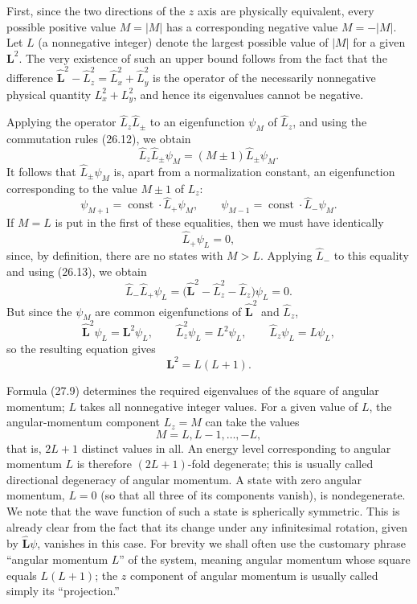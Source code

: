 First, since the two directions of the $z$ axis are physically equivalent,
every possible positive value $M=|M|$ has a corresponding negative value
$M=-|M|$. Let $L$ (a nonnegative integer) denote the largest possible value
of $|M|$ for a given $\mathbf L^2$. The very existence of such an upper bound
follows from the fact that the difference
$\hat{\mathbf L}^{2}-\hat L_z^{2}=\hat L_x^{2}+\hat L_y^{2}$ is the operator
of the necessarily nonnegative physical quantity $L_x^2+L_y^2$,
and hence its eigenvalues cannot be negative.

Applying the operator $\hat L_z\hat L_\pm$ to an eigenfunction $\psi_M$ of
$\hat L_z$, and using the commutation rules (26.12), we obtain
\begin{equation}
  \hat L_z\hat L_\pm\psi_M=(M\pm1)\hat L_\pm\psi_M.
  \tag{27.6}
\end{equation}
It follows that $\hat L_\pm\psi_M$ is, apart from a normalization constant,
an eigenfunction corresponding to the value $M\pm1$ of $L_z$:
\begin{equation}
  \psi_{M+1}=\operatorname{const}\cdot\hat L_+\psi_M,
  \qquad
  \psi_{M-1}=\operatorname{const}\cdot\hat L_-\psi_M.
  \tag{27.7}
\end{equation}
If $M=L$ is put in the first of these equalities, then we must have identically
\begin{equation}
  \hat L_+\psi_L=0,
  \tag{27.8}
\end{equation}
since, by definition, there are no states with $M>L$. Applying $\hat L_-$ to
this equality and using (26.13), we obtain
\[
  \hat L_-\hat L_+\psi_L
  =\bigl(\hat{\mathbf L}^{2}-\hat L_z^{2}-\hat L_z\bigr)\psi_L=0.
\]
But since the $\psi_M$ are common eigenfunctions of
$\hat{\mathbf L}^{2}$ and $\hat L_z$,
\[
  \hat{\mathbf L}^{2}\psi_L=\mathbf L^2\psi_L,
  \qquad
  \hat L_z^{2}\psi_L=L^2\psi_L,
  \qquad
  \hat L_z\psi_L=L\psi_L,
\]
so the resulting equation gives
\begin{equation}
  \mathbf L^2=L(L+1).
  \tag{27.9}
\end{equation}

Formula (27.9) determines the required eigenvalues of the square of angular
momentum; $L$ takes all nonnegative integer values. For a given value of $L$,
the angular-momentum component $L_z=M$ can take the values
\begin{equation}
  M=L,L-1,\ldots,-L,
  \tag{27.10}
\end{equation}
that is, $2L+1$ distinct values in all. An energy level corresponding to
angular momentum $L$ is therefore $(2L+1)$-fold degenerate; this is usually
called directional degeneracy of angular momentum. A state with zero angular
momentum, $L=0$ (so that all three of its components vanish), is
nondegenerate. We note that the wave function of such a state is spherically
symmetric. This is already clear from the fact that its change under any
infinitesimal rotation, given by $\hat{\mathbf L}\psi$, vanishes in this case.
For brevity we shall often use the customary phrase “angular momentum $L$”
of the system, meaning angular momentum whose square equals $L(L+1)$; the
$z$ component of angular momentum is usually called simply its “projection.”

